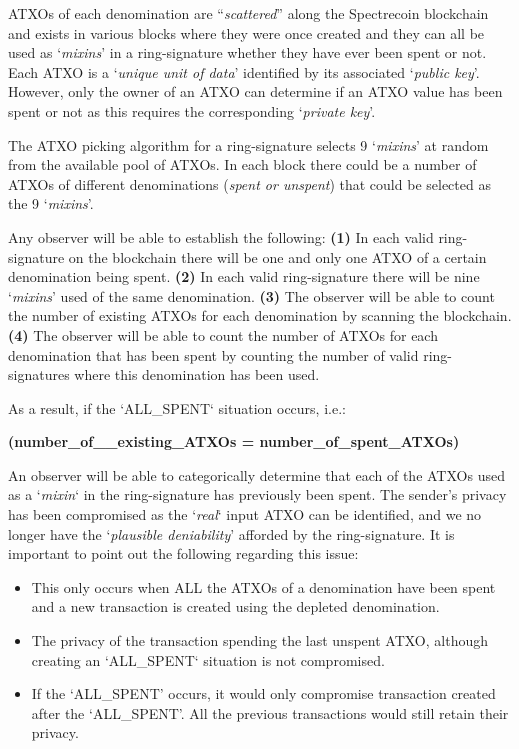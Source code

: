ATXOs of each denomination are “\textit{scattered}” along the Spectrecoin
blockchain and exists in various blocks where they were once created and
they can all be used as ‘\textit{mixins}’ in a ring-signature whether they
have ever been spent or not. Each ATXO is a ‘\textit{unique unit of data}’
identified by its associated ‘\textit{public key}’. However, only the
owner of an ATXO can determine if an ATXO value has been spent or not
as this requires the corresponding ‘\textit{private key}’.



The ATXO picking algorithm for a ring-signature selects 9 ‘\textit{mixins}’
at random from the available pool of ATXOs. In each block there could be a
number of ATXOs of different denominations (\textit{spent or unspent})
that could be selected as the 9 ‘\textit{mixins}’.



Any observer will be able to establish the following: \textbf{(1)} In each
valid ring-signature on the blockchain there will be one and only one ATXO
of a certain denomination being spent. \textbf{(2)} In each valid
ring-signature there will be nine ‘\textit{mixins}’ used of the same
denomination. \textbf{(3)} The observer will be able to count the number
of existing ATXOs for each denomination by scanning the blockchain.
\textbf{(4)} The observer will be able to count the number of ATXOs for
each denomination that has been spent by counting the number of valid
ring-signatures where this denomination has been used.



As a result, if the ‘ALL\_SPENT‘ situation occurs, i.e.:



\textbf{(number\_of\_\_existing\_ATXOs = number\_of\_spent\_ATXOs) }



An observer will be able to categorically determine that each of the ATXOs
used as a ‘\textit{mixin}‘ in the ring-signature has previously been spent.
The sender’s privacy has been compromised as the ‘\textit{real}‘ input ATXO
can be identified, and we no longer have the ‘\textit{plausible deniability}’
afforded by the ring-signature. It is important to point out the following
regarding this issue:



\begin{itemize}
	\item This only occurs when ALL the ATXOs of a denomination have been
	spent and a new transaction is created using the depleted denomination.
	\item The privacy of the transaction spending the last unspent ATXO,
	although creating an ‘ALL\_SPENT‘ situation is not compromised.
	\item If the ‘ALL\_SPENT’ occurs, it would only compromise transaction
	created after the ‘ALL\_SPENT’. All the previous transactions would still
	retain their privacy.
\end{itemize}




